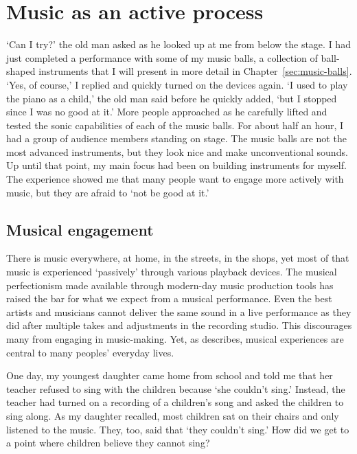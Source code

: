 \chapter{Music as an active process}


`Can I try?' the old man asked as he looked up at me from below the stage. I had just completed a performance with some of my music balls, a collection of ball-shaped instruments that I will present in more detail in Chapter~\ref{sec:music-balls}. `Yes, of course,' I replied and quickly turned on the devices again. `I used to play the piano as a child,' the old man said before he quickly added, `but I stopped since I was no good at it.' More people approached as he carefully lifted and tested the sonic capabilities of each of the music balls. For about half an hour, I had a group of audience members standing on stage. The music balls are not the most advanced instruments, but they look nice and make unconventional sounds. Up until that point, my main focus had been on building instruments for myself. The experience showed me that many people want to engage more actively with music, but they are afraid to `not be good at it.'


\section{Musical engagement}

There is music everywhere, at home, in the streets, in the shops, yet most of that music is experienced `passively' through various playback devices. The musical perfectionism made available through modern-day music production tools has raised the bar for what we expect from a musical performance. Even the best artists and musicians cannot deliver the same sound in a live performance as they did after multiple takes and adjustments in the recording studio. This discourages many from engaging in music-making. Yet, as \citet{denora_music_2000} describes, musical experiences are central to many peoples' everyday lives.

One day, my youngest daughter came home from school and told me that her teacher refused to sing with the children because `she couldn't sing.' Instead, the teacher had turned on a recording of a children's song and asked the children to sing along. As my daughter recalled, most children sat on their chairs and only listened to the music. They, too, said that `they couldn't sing.' How did we get to a point where children believe they cannot sing?

